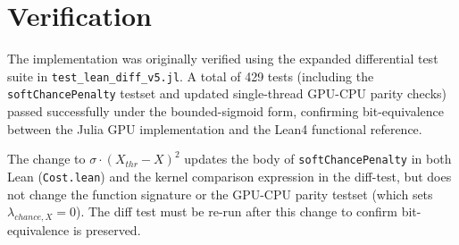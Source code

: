 \documentclass[11pt,a4paper]{article}
\begin{document}
\section{Verification}
The implementation was originally verified using the expanded differential test suite in \texttt{test\_lean\_diff\_v5.jl}. A total of 429 tests (including the \texttt{softChancePenalty} testset and updated single-thread GPU-CPU parity checks) passed successfully under the bounded-sigmoid form, confirming bit-equivalence between the Julia GPU implementation and the Lean4 functional reference.

The change to $\sigma \cdot (X_{thr}-X)^2$ updates the body of \texttt{softChancePenalty} in both Lean (\texttt{Cost.lean}) and the kernel comparison expression in the diff-test, but does not change the function signature or the GPU-CPU parity testset (which sets $\lambda_{chance,X} = 0$). The diff test must be re-run after this change to confirm bit-equivalence is preserved.
\end{document}
